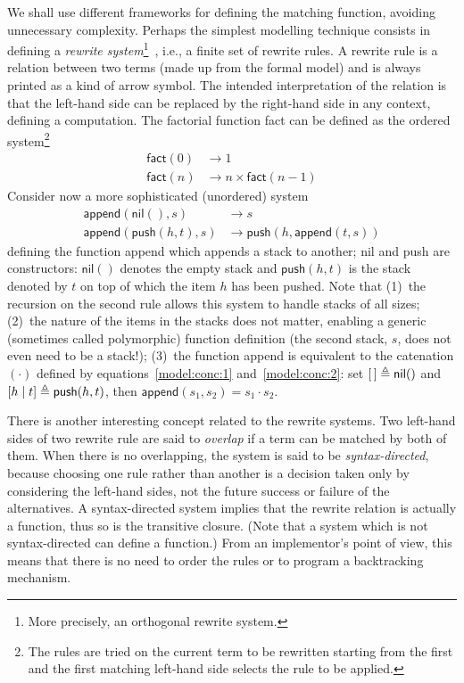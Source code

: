 We shall use different frameworks for defining the matching function,
avoiding unnecessary complexity. Perhaps the simplest modelling
technique consists in defining a \emph{rewrite system}\footnote{More
precisely, an orthogonal rewrite system.}~\cite{HTCS:1990}, i.e., a
finite set of rewrite rules. A rewrite rule is a relation between two
terms (made up from the formal model) and is always printed as a kind
of arrow symbol. The intended interpretation of the relation is that
the left\hyp{}hand side can be replaced by the right\hyp{}hand side in
any context, defining a computation. The factorial function
\textsf{fact} can be defined as the ordered system\footnote{The rules
are tried on the current term to be rewritten starting from the first
and the first matching left\hyp{}hand side selects the rule to be
applied.}
\begin{align*}
\textsf{fact}(0) &\rightarrow 1\\
\textsf{fact}(n) &\rightarrow n \times \textsf{fact}(n-1)
\end{align*}
Consider now a more sophisticated (unordered) system 
\begin{align*}
\textsf{append}(\textsf{nil}(), s) &\rightarrow s\\
\textsf{append}(\textsf{push}(h,t), s) &\rightarrow 
\textsf{push}(h, \textsf{append}(t, s))
\end{align*}
defining the function \textsf{append} which appends a stack to
another; \textsf{nil} and \textsf{push} are constructors:
\(\textsf{nil}()\) denotes the empty stack and \(\textsf{push}(h, t)\)
is the stack denoted by \(t\) on top of which the item \(h\) has been
pushed. Note that (1)~the recursion on the second rule allows this
system to handle stacks of all sizes; (2)~the nature of the items in
the stacks does not matter, enabling a generic (sometimes called
polymorphic) function definition (the second stack, \(s\), does not
even need to be a stack!); (3)~the function \textsf{append} is
equivalent to the catenation \((\cdot)\) defined by
equations~\eqref{model:conc:1} and~\eqref{model:conc:2}: set \([\,]
\triangleq \textsf{nil}()\) and \([{h}\mid{t}] \triangleq
\textsf{push}(h, t)\), then \(\textsf{append}(s_1, s_2) = s_1 \cdot
s_2\).

There is another interesting concept related to the rewrite
systems. Two left\hyp{}hand sides of two rewrite rule are said to
\emph{overlap} if a term can be matched by both of them. When there is
no overlapping, the system is said to be \emph{syntax\hyp{}directed},
because choosing one rule rather than another is a decision taken only
by considering the left\hyp{}hand sides, not the future success or
failure of the alternatives. A syntax\hyp{}directed system implies
that the rewrite relation is actually a function, thus so is the
transitive closure. (Note that a system which is not
syntax\hyp{}directed can define a function.) From an implementor's
point of view, this means that there is no need to order the rules or
to program a backtracking mechanism.

